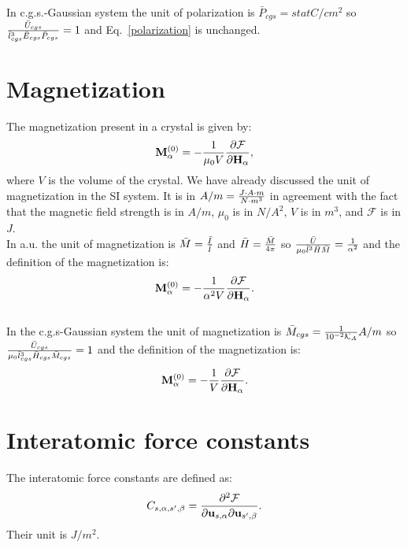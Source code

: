 \documentclass[12pt,a4paper]{article}
\begin{document}
{\color{orange} In c.g.s.-Gaussian system the unit of polarization is 
$\bar P_{cgs}= statC/cm^2$ so ${\bar U_{cgs} \over \bar l_{cgs}^3 
\bar E_{cgs} \bar P_{cgs}}=1$ and
Eq.~\ref{polarization} is unchanged.
}

\newpage
\section{\color{coral}Magnetization}
The magnetization present in a crystal is given by:
\begin{equation}
{\bf M}^{(0)}_{\alpha}=-{1\over \mu_0 V} 
{\partial \mathcal{F} \over \partial {\bf H}_{\alpha}},
\label{magnetization}
\end{equation}
where $V$ is the volume of the crystal.
We have already discussed the unit of magnetization in the SI system. It is
in $A/m={J\cdot A \cdot m \over N\cdot m^3}$ in agreement with the fact 
that the magnetic field strength is in $A/m$, $\mu_0$ is in $N/A^2$, $V$ is
in $m^3$, and $\mathcal{F}$ is in $J$.
\\

{\color{web-blue} In a.u. the unit of magnetization is 
$\bar M= {\bar I \over \bar l}$ and $\bar H ={\bar M \over 4 \pi}$ so 
${\bar U \over \mu_0 \bar l^3 \bar H \bar M}={1\over \alpha^2}$ and
the definition of the magnetization is:
\begin{equation}
{\bf M}^{(0)}_{\alpha}=-{1\over \alpha^2 V} 
{\partial \mathcal{F} \over \partial {\bf H}_{\alpha}}.
\label{magnetizationau}
\end{equation}
}
\\

{\color{orange} In the c.g.s-Gaussian system the unit of magnetization is 
$\bar M_{cgs}= {1\over 10^{-2} \mathcal{K}_A} A/m$ so 
${\bar U_{cgs} \over \mu_0 \bar l_{cgs}^3 
\bar H_{cgs} \bar M_{cgs}}=1$ and the definition of the magnetization
is:
\begin{equation}
{\bf M}^{(0)}_{\alpha}=-{1\over V} 
{\partial \mathcal{F} \over \partial {\bf H}_{\alpha}}.
\label{magnetization}
\end{equation}
}


\newpage
\section{\color{coral}Interatomic force constants}
The interatomic force constants are defined as:
\begin{equation}
C_{s,\alpha,s',\beta}={\partial^2 \mathcal{F} \over \partial 
{\bf u}_{s,\alpha} \partial {\bf u}_{s',\beta}}.
\label{ifc}
\end{equation}
Their unit is $J/m^2$.
\\
\end{document}
